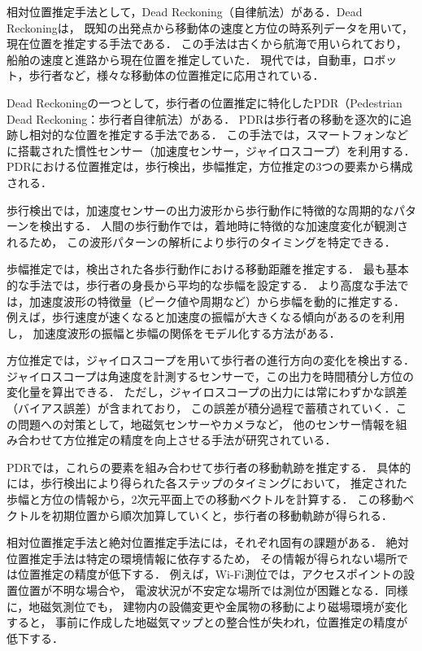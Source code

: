 相対位置推定手法として，Dead Reckoning（自律航法）がある．Dead Reckoningは，
既知の出発点から移動体の速度と方位の時系列データを用いて，現在位置を推定する手法である．
この手法は古くから航海で用いられており，船舶の速度と進路から現在位置を推定していた．
現代では，自動車，ロボット，歩行者など，様々な移動体の位置推定に応用されている．

Dead Reckoningの一つとして，歩行者の位置推定に特化したPDR（Pedestrian Dead Reckoning：歩行者自律航法）がある．
PDRは歩行者の移動を逐次的に追跡し相対的な位置を推定する手法である．
この手法では，スマートフォンなどに搭載された慣性センサー（加速度センサー，ジャイロスコープ）を利用する．
PDRにおける位置推定は，歩行検出，歩幅推定，方位推定の3つの要素から構成される．

歩行検出では，加速度センサーの出力波形から歩行動作に特徴的な周期的なパターンを検出する．
人間の歩行動作では，着地時に特徴的な加速度変化が観測されるため，
この波形パターンの解析により歩行のタイミングを特定できる．

歩幅推定では，検出された各歩行動作における移動距離を推定する．
最も基本的な手法では，歩行者の身長から平均的な歩幅を設定する．
より高度な手法では，加速度波形の特徴量（ピーク値や周期など）から歩幅を動的に推定する．
例えば，歩行速度が速くなると加速度の振幅が大きくなる傾向があるのを利用し，
加速度波形の振幅と歩幅の関係をモデル化する方法がある．

方位推定では，ジャイロスコープを用いて歩行者の進行方向の変化を検出する．
ジャイロスコープは角速度を計測するセンサーで，この出力を時間積分し方位の変化量を算出できる．
ただし，ジャイロスコープの出力には常にわずかな誤差（バイアス誤差）が含まれており，
この誤差が積分過程で蓄積されていく．この問題への対策として，地磁気センサーやカメラなど，
他のセンサー情報を組み合わせて方位推定の精度を向上させる手法が研究されている．

PDRでは，これらの要素を組み合わせて歩行者の移動軌跡を推定する．
具体的には，歩行検出により得られた各ステップのタイミングにおいて，
推定された歩幅と方位の情報から，2次元平面上での移動ベクトルを計算する．
この移動ベクトルを初期位置から順次加算していくと，歩行者の移動軌跡が得られる．

相対位置推定手法と絶対位置推定手法には，それぞれ固有の課題がある．
絶対位置推定手法は特定の環境情報に依存するため，
その情報が得られない場所では位置推定の精度が低下する．
例えば，Wi-Fi測位では，アクセスポイントの設置位置が不明な場合や，
電波状況が不安定な場所では測位が困難となる．同様に，地磁気測位でも，
建物内の設備変更や金属物の移動により磁場環境が変化すると，
事前に作成した地磁気マップとの整合性が失われ，位置推定の精度が低下する．

